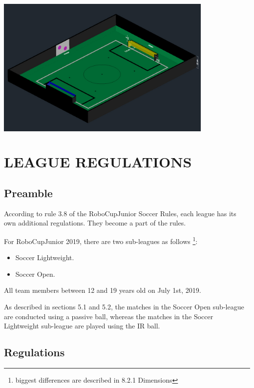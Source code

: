 \documentclass{article}
\begin{document}
\begin{center}
\includegraphics[width=0.8\textwidth]{media/image7_new.jpeg}

\end{center}

\section{LEAGUE REGULATIONS \label{section:league_regulations}}

\subsection{ Preamble \label{ref-053}}

According to rule 3.8 of the RoboCupJunior Soccer Rules, each league has its
own additional regulations. They become a part of the rules.

For RoboCupJunior 2019, there are two sub-leagues as follows
\footnote{biggest differences are described in 8.2.1 Dimensions}:

\begin{itemize}

\item Soccer Lightweight.

\item Soccer Open.

\end{itemize}

All team members between 12 and 19 years old on July 1st, 2019.

As described in sections 5.1 and 5.2, the matches in the Soccer Open sub-league
are conducted using a passive ball, whereas the matches in the Soccer
Lightweight sub-league are played using the IR ball.

\subsection{Regulations \label{ref-054}}
\end{document}
